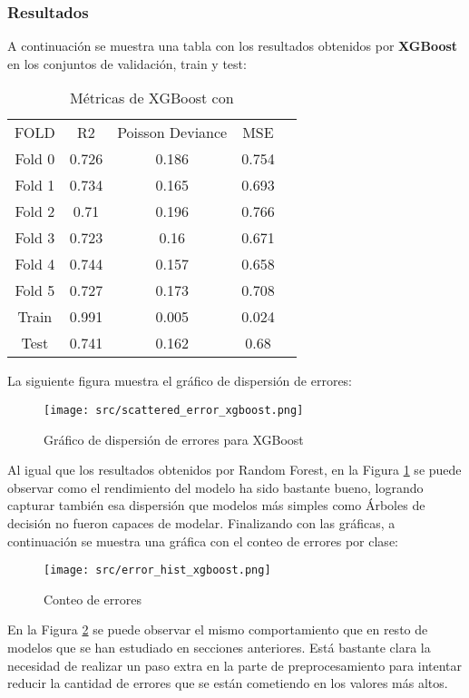 \subsubsection*{Resultados}
A continuación se muestra una tabla con los resultados obtenidos por \textbf{XGBoost} en los conjuntos de validación, train y test:
\begin{table}[H]
	\centering
	\begin{tabular}{|c|c|c|c|c|}
		\cline{1-4}
		FOLD   & R2    & Poisson Deviance & MSE   \\ \cline{1-4}
		Fold 0 & 0.726 & 0.186            & 0.754 \\ \cline{1-4}
		Fold 1 & 0.734 & 0.165            & 0.693 \\ \cline{1-4}
		Fold 2 & 0.71  & 0.196            & 0.766 \\ \cline{1-4}
		Fold 3 & 0.723 & 0.16             & 0.671 \\ \cline{1-4}
		Fold 4 & 0.744 & 0.157            & 0.658 \\ \cline{1-4}
		Fold 5 & 0.727 & 0.173            & 0.708 \\ \cline{1-4}
		Train  & 0.991 & 0.005            & 0.024 \\ \cline{1-4}
		Test   & 0.741 & 0.162            & 0.68  \\ \cline{1-4}
	\end{tabular}
	\caption{Métricas de XGBoost con}
	\label{tab:xgboost}
\end{table}
\clearpage
La siguiente figura muestra el gráfico de dispersión de errores:
\begin{figure}[H]
	\centering
	\texttt{[image: src/scattered\_error\_xgboost.png]}
	\caption{Gráfico de dispersión de errores para XGBoost}
	\label{fig:xgboost_scattered}
\end{figure}
Al igual que los resultados obtenidos por Random Forest, en la Figura \ref{fig:xgboost_scattered} se puede observar como el rendimiento del modelo ha sido bastante bueno, logrando capturar también esa dispersión que modelos más simples como Árboles de decisión no fueron capaces de modelar. 
\clearpage
Finalizando con las gráficas, a continuación se muestra una gráfica con el conteo de errores por clase:
\begin{figure}[H]
	\centering
	\texttt{[image: src/error\_hist\_xgboost.png]}
	\caption{Conteo de errores}
	\label{fig:xgboost_error_plot}
\end{figure}
En la Figura \ref{fig:xgboost_error_plot} se puede observar el mismo comportamiento que en resto de modelos que se han estudiado en secciones anteriores. Está bastante clara la necesidad de realizar un paso extra en la parte de preprocesamiento para intentar reducir la cantidad de errores que se están cometiendo en los valores más altos.
\clearpage
